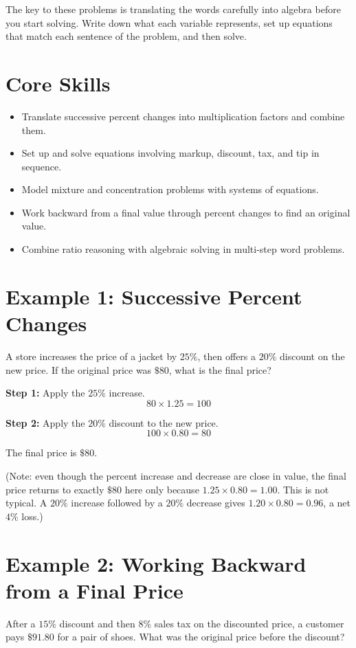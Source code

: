 \documentclass[14pt]{extarticle}
\begin{document}
The key to these problems is translating the words carefully into algebra before you start solving. Write down what each variable represents, set up equations that match each sentence of the problem, and then solve.

\section*{Core Skills}
\begin{itemize}
  \item Translate successive percent changes into multiplication factors and combine them.
  \item Set up and solve equations involving markup, discount, tax, and tip in sequence.
  \item Model mixture and concentration problems with systems of equations.
  \item Work backward from a final value through percent changes to find an original value.
  \item Combine ratio reasoning with algebraic solving in multi-step word problems.
\end{itemize}

\section*{Example 1: Successive Percent Changes}

A store increases the price of a jacket by \(25\%\), then offers a \(20\%\) discount on the new price. If the original price was \(\$80\), what is the final price?

\textbf{Step 1:} Apply the \(25\%\) increase.
\[
80 \times 1.25 = 100
\]

\textbf{Step 2:} Apply the \(20\%\) discount to the new price.
\[
100 \times 0.80 = 80
\]

The final price is \(\boxed{\$80}\).

(Note: even though the percent increase and decrease are close in value, the final price returns to exactly \(\$80\) here only because \(1.25 \times 0.80 = 1.00\). This is not typical. A \(20\%\) increase followed by a \(20\%\) decrease gives \(1.20 \times 0.80 = 0.96\), a net \(4\%\) loss.)

\section*{Example 2: Working Backward from a Final Price}

After a \(15\%\) discount and then \(8\%\) sales tax on the discounted price, a customer pays \(\$91.80\) for a pair of shoes. What was the original price before the discount?
\end{document}
